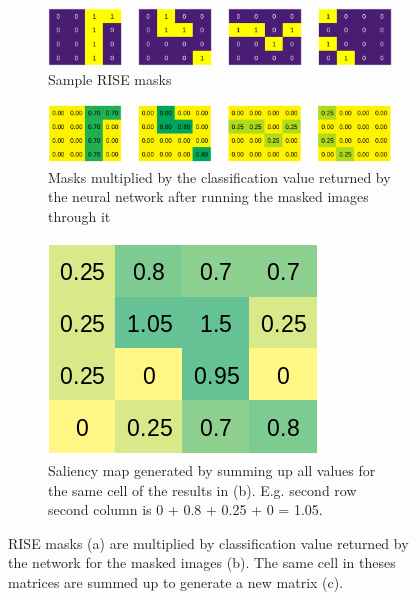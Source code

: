 \begin{figure}[H]
    \centering
    \begin{subfigure}[t]{\textwidth}
        \centering
        \includegraphics[width=\linewidth]{chapters/02_methods/images/rise/explain_rise_masks.png}
        \caption{Sample RISE masks}
    \end{subfigure}
    \begin{subfigure}[t]{\textwidth}
        \centering
        \includegraphics[width=\linewidth]{chapters/02_methods/images/rise/explain_rise_result.png}
        \caption{Masks multiplied by the classification value returned by the neural network after running the masked images through it}
    \end{subfigure}\hfill
    \begin{subfigure}[t]{.5\textwidth}
        \centering
        \includegraphics[width=\linewidth]{chapters/02_methods/images/rise/explain_rise_saliency.png}
        \caption{Saliency map generated by summing up all values for the same cell of the results in (b). E.g. second row second column is 0 + 0.8  + 0.25 + 0 = 1.05.}
    \end{subfigure}
    \caption{RISE masks (a) are multiplied by classification value returned by the network for the masked images (b). The same cell in theses matrices are summed up to generate a new matrix (c).}
    \label{rise_explanation}
\end{figure}

